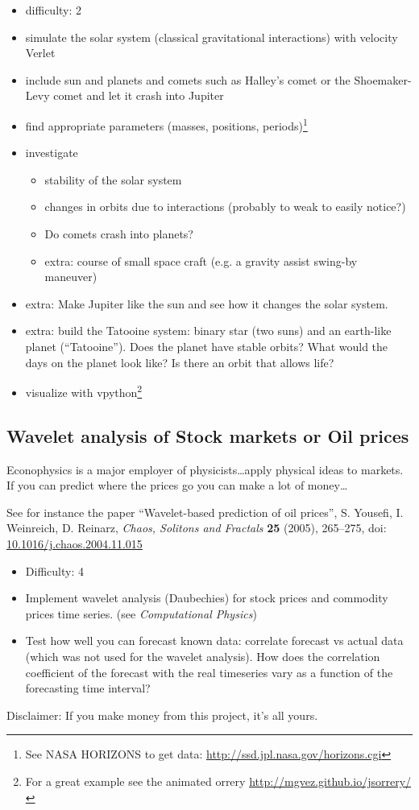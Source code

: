 \documentclass[letterpaper]{scrartcl}
\begin{document}
\begin{itemize}
\item difficulty: 2
\item simulate the solar system (classical gravitational interactions)
  with velocity Verlet
\item include sun and planets and comets such as Halley's comet or the
  Shoemaker-Levy comet and let it crash into Jupiter
\item find appropriate parameters (masses, positions,
  periods)\footnote{See NASA HORIZONS to get data:
    \url{http://ssd.jpl.nasa.gov/horizons.cgi}}
\item investigate
  \begin{itemize}
  \item stability of the solar system
  \item changes in orbits due to interactions (probably to weak to
    easily notice?)
  \item Do comets crash into planets?
  \item extra: course of small space craft (e.g. a gravity assist
    swing-by maneuver)
  \end{itemize}
\item extra: Make Jupiter like the sun and see how it changes the
  solar system.
\item extra: build the Tatooine system: binary star (two suns) and an
  earth-like planet (``Tatooine''). Does the planet have stable
  orbits? What would the days on the planet look like? Is there an
  orbit that allows life?
\item visualize with vpython\footnote{For a great example see the animated orrery
    \url{http://mgvez.github.io/jsorrery/}}
\end{itemize}



\subsection{Wavelet analysis of Stock markets or Oil prices}

Econophysics is a major employer of physicists\dots apply physical
ideas to markets. If you can predict where the prices go you can make a
lot of money\dots

See for instance the paper ``Wavelet-based prediction of oil
  prices'', S. Yousefi, I. Weinreich, D. Reinarz, \emph{Chaos,
    Solitons and Fractals} \textbf{25} (2005), 265--275, doi:
  \href{http://doi.org/10.1016/j.chaos.2004.11.015}{10.1016/j.chaos.2004.11.015}
\begin{itemize}
\item Difficulty: 4
\item Implement wavelet analysis (Daubechies) for stock prices and
  commodity prices time series. (see \emph{Computational Physics})
\item Test how  well you can forecast known data: correlate forecast
  vs actual data (which was not used for the wavelet analysis). How
  does the correlation coefficient of the forecast with the real
  timeseries vary as a function of the forecasting time interval?
\end{itemize}
Disclaimer: If you make money from this project, it's all yours.
\end{document}
